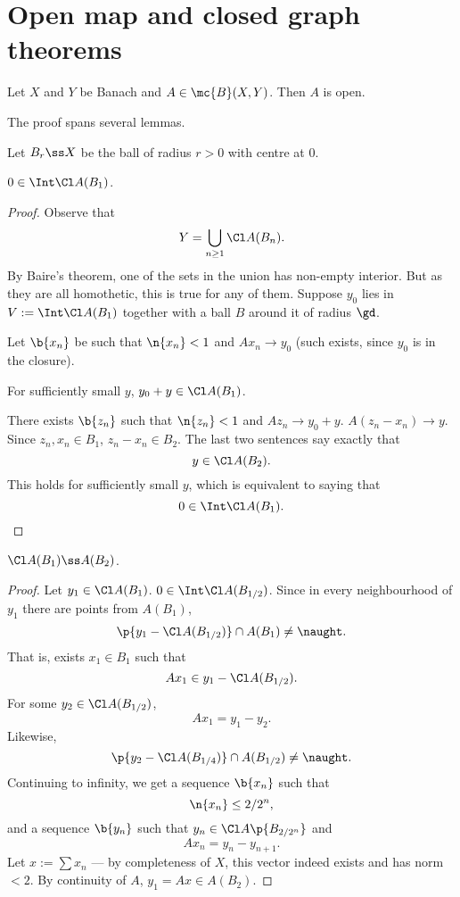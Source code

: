 \section{Open map and closed graph theorems}

\begin{theorem}
  Let $X$ and $Y$ be Banach and $A \in \mc{B}(X, Y)$.
  Then $A$ is open.
\end{theorem}

The proof spans several lemmas.

Let $B_r \ss X$ be the ball of radius $r > 0$ with centre at $0$.

\begin{lemma}
  $0 \in \Int \Cl A(B_1)$.
\end{lemma}

\begin{proof}
  Observe that
  $$ Y = \bigcup_{n \ge 1} \Cl A(B_n). $$
  By Baire's theorem, one of the sets in the union has non-empty interior.
  But as they are all homothetic, this is true for any of them.
  Suppose $y_0$ lies in $V := \Int \Cl A(B_1)$ together with a ball $B$ around it of radius $\gd$.
  
  Let $\b{x_n}$ be such that $\n{x_n} < 1$ and $Ax_n \to y_0$ (such exists, since $y_0$ is in the closure).
  
  For sufficiently small $y$, $y_0 + y \in \Cl A(B_1)$.
  
  There exists $\b{z_n}$ such that $\n{z_n} < 1$ and $Az_n \to y_0 + y$.
  $A(z_n-x_n) \to y$.
  Since $z_n, x_n \in B_1$, $z_n-x_n \in B_2$.
  The last two sentences say exactly that
  $$ y \in \Cl A(B_2). $$
  This holds for sufficiently small $y$, which is equivalent to saying that
  $$ 0 \in \Int \Cl A(B_1). $$
\end{proof}

\begin{lemma}
  $\Cl A(B_1) \ss A(B_2)$.
\end{lemma}

\begin{proof}
   Let $y_1 \in \Cl A(B_1)$.
   $0 \in \Int \Cl A(B_{1/2})$.
   Since in every neighbourhood of $y_1$ there are points from $A(B_1)$,
   $$ \p{y_1-\Cl A(B_{1/2})} \cap A(B_1) \ne \naught. $$
   That is, exists $x_1 \in B_1$ such that
   $$ Ax_1 \in y_1 - \Cl A(B_{1/2}). $$
   For some $y_2 \in \Cl A(B_{1/2})$,
   $$ Ax_1 = y_1-y_2. $$
   Likewise, 
   $$ \p{y_2-\Cl A(B_{1/4})} \cap A(B_{1/2}) \ne \naught. $$
   Continuing to infinity, we get a sequence $\b{x_n}$ such that
   $$ \n{x_n} \le 2/2^n, $$
  and a sequence $\b{y_n}$ such that $y_n \in \Cl A\p{B_{2/2^n}}$ and
   $$ Ax_n = y_n-y_{n+1}. $$
   Let $x := \sum x_n$ --- by completeness of $X$, this vector indeed exists and has norm $< 2$.
   By continuity of $A$, $y_1 = Ax \in A(B_2)$.
\end{proof}

